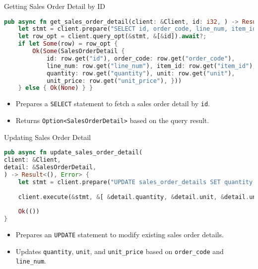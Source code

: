 \documentclass[aspectratio=169, table]{beamer}
\begin{document}
\begin{frame}[fragile]{Getting Sales Order Detail by ID}
\vspace{15pt}
\begin{lstlisting}[language=Rust]
pub async fn get_sales_order_detail(client: &Client, id: i32, ) -> Result<Option<SalesOrderDetail>, Error> {
	let stmt = client.prepare("SELECT id, order_code, line_num, item_id, quantity, unit, unit_price FROM sales_order_details WHERE id = $1").await?;
	let row_opt = client.query_opt(&stmt, &[&id]).await?;
	if let Some(row) = row_opt {
		Ok(Some(SalesOrderDetail {
			id: row.get("id"), order_code: row.get("order_code"),
			line_num: row.get("line_num"), item_id: row.get("item_id"),
			quantity: row.get("quantity"), unit: row.get("unit"),
			unit_price: row.get("unit_price"), }))
	} else { Ok(None) } }
\end{lstlisting}
\begin{itemize}
\item Prepares a \texttt{SELECT} statement to fetch a sales order detail by \texttt{id}.
\item Returns \texttt{Option<SalesOrderDetail>} based on the query result.
\end{itemize}
\end{frame}



\begin{frame}[fragile]{Updating Sales Order Detail}
\vspace{15pt}
\begin{lstlisting}[language=Rust]
pub async fn update_sales_order_detail(
client: &Client,
detail: &SalesOrderDetail,
) -> Result<(), Error> {
	let stmt = client.prepare("UPDATE sales_order_details SET quantity = $1, unit = $2, unit_price = $3 WHERE order_code = $4 and line_num = $5",).await?;
	
	client.execute(&stmt, &[ &detail.quantity, &detail.unit, &detail.unit_price, &detail.order_code, &detail.line_num, ], ).await?;
	
	Ok(())
}
\end{lstlisting}
\begin{itemize}
\item Prepares an \texttt{UPDATE} statement to modify existing sales order details.
\item Updates \texttt{quantity}, \texttt{unit}, and \texttt{unit\_price} based on \texttt{order\_code} and \texttt{line\_num}.
\end{itemize}
\end{frame}
\end{document}
